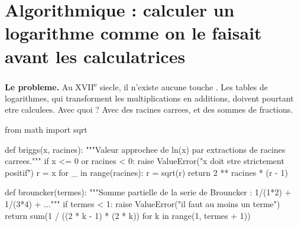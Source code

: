 
\section{Algorithmique : calculer un logarithme comme on le faisait avant les calculatrices}



\textbf{Le probleme.} Au XVII\textsuperscript{e} siecle, il n'existe aucune touche
. Les tables de logarithmes, qui transforment les multiplications en
additions, doivent pourtant etre calculees. Avec quoi ? Avec des racines
carrees, et des sommes de fractions.



\begin{python}
from math import sqrt

def briggs(x, racines):
    """Valeur approchee de ln(x) par extractions de racines carrees."""
    if x <= 0 or racines < 0:
        raise ValueError("x doit etre strictement positif")
    r = x
    for _ in range(racines):
        r = sqrt(r)
    return 2 ** racines * (r - 1)

def brouncker(termes):
    """Somme partielle de la serie de Brouncker : 1/(1*2) + 1/(3*4) + ..."""
    if termes < 1:
        raise ValueError("il faut au moins un terme")
    return sum(1 / ((2 * k - 1) * (2 * k)) for k in range(1, termes + 1))
\end{python}

